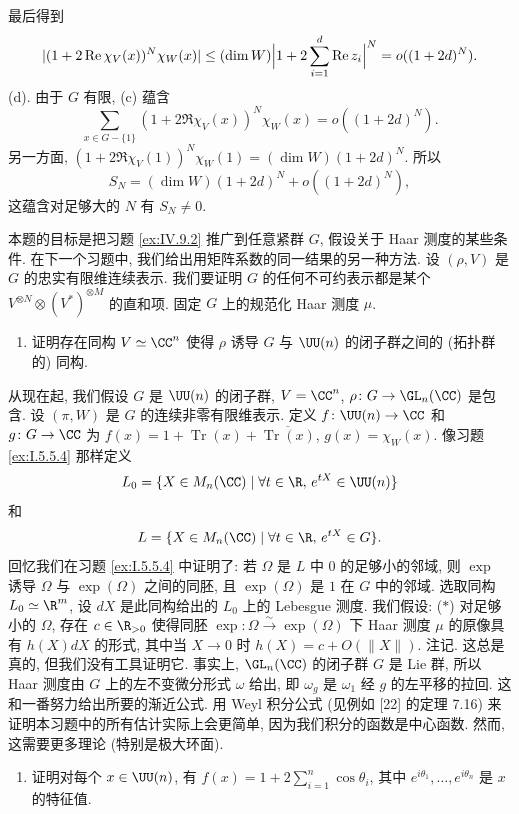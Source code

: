 \begin{solution}
最后得到
\[
|(1 + 2\Re\chi_V(x))^N\chi_W(x)| \leq (\dim W)\Bigl|1 + 2\sum_{i=1}^d\Re z_i\Bigr|^N = o((1 + 2d)^N).
\]
(d). 由于 $G$ 有限, (c) 蕴含
\[
\sum_{x \in G-\{1\}}(1 + 2\Re\chi_V(x))^N\chi_W(x) = o((1 + 2d)^N).
\]
另一方面, $(1 + 2\Re\chi_V(1))^N\chi_W(1) = (\dim W)(1 + 2d)^N$. 所以
\[
S_N = (\dim W)(1 + 2d)^N + o((1 + 2d)^N),
\]
这蕴含对足够大的 $N$ 有 $S_N \neq 0$.
\end{solution}

\begin{exercise}
\label{ex:IV.9.3}
本题的目标是把习题 \ref{ex:IV.9.2} 推广到任意紧群 $G$, 假设关于 Haar 测度的某些条件. 在下一个习题中, 我们给出用矩阵系数的同一结果的另一种方法.
设 $(\rho, V)$ 是 $G$ 的忠实有限维连续表示. 我们要证明 $G$ 的任何不可约表示都是某个 $V^{\otimes N} \otimes (V^*)^{\otimes M}$ 的直和项. 固定 $G$ 上的规范化 Haar 测度 $\mu$.
\begin{enumerate}
\item[(a)] 证明存在同构 $V \simeq \CC^n$ 使得 $\rho$ 诱导 $G$ 与 $\UU(n)$ 的闭子群之间的 (拓扑群的) 同构.
\end{enumerate}
从现在起, 我们假设 $G$ 是 $\UU(n)$ 的闭子群, $V = \CC^n$, $\rho \colon G \to \GL_n(\CC)$ 是包含. 设 $(\pi, W)$ 是 $G$ 的连续非零有限维表示. 定义 $f \colon \UU(n) \to \CC$ 和 $g \colon G \to \CC$ 为 $f(x) = 1 + \operatorname{Tr}(x) + \overline{\operatorname{Tr}(x)}$, $g(x) = \chi_W(x)$.
像习题 \ref{ex:I.5.5.4} 那样定义
\[
L_0 = \{X \in M_n(\CC) \mid \forall t \in \R,\, e^{tX} \in \UU(n)\}
\]
和
\[
L = \{X \in M_n(\CC) \mid \forall t \in \R,\, e^{tX} \in G\}.
\]
回忆我们在习题 \ref{ex:I.5.5.4} 中证明了: 若 $\Omega$ 是 $L$ 中 $0$ 的足够小的邻域, 则 $\exp$ 诱导 $\Omega$ 与 $\exp(\Omega)$ 之间的同胚, 且 $\exp(\Omega)$ 是 $1$ 在 $G$ 中的邻域. 选取同构 $L_0 \simeq \R^m$, 设 $dX$ 是此同构给出的 $L_0$ 上的 Lebesgue 测度. 我们假设: ($*$) 对足够小的 $\Omega$, 存在 $c \in \R_{>0}$ 使得同胚 $\exp \colon \Omega \xrightarrow{\sim} \exp(\Omega)$ 下 Haar 测度 $\mu$ 的原像具有 $h(X)dX$ 的形式, 其中当 $X \to 0$ 时 $h(X) = c + O(\|X\|)$.
注记. 这总是真的, 但我们没有工具证明它. 事实上, $\GL_n(\CC)$ 的闭子群 $G$ 是 Lie 群, 所以 Haar 测度由 $G$ 上的左不变微分形式 $\omega$ 给出, 即 $\omega_g$ 是 $\omega_1$ 经 $g$ 的左平移的拉回. 这和一番努力给出所要的渐近公式.
用 Weyl 积分公式 (见例如 {[}22{]} 的定理 7.16) 来证明本习题中的所有估计实际上会更简单, 因为我们积分的函数是中心函数. 然而, 这需要更多理论 (特别是极大环面).
\begin{enumerate}
\item[(a)] 证明对每个 $x \in \UU(n)$, 有 $f(x) = 1 + 2\sum_{i=1}^n\cos\theta_i$, 其中 $e^{i\theta_1}, \ldots, e^{i\theta_n}$ 是 $x$ 的特征值.

\end{enumerate}
\end{exercise}

